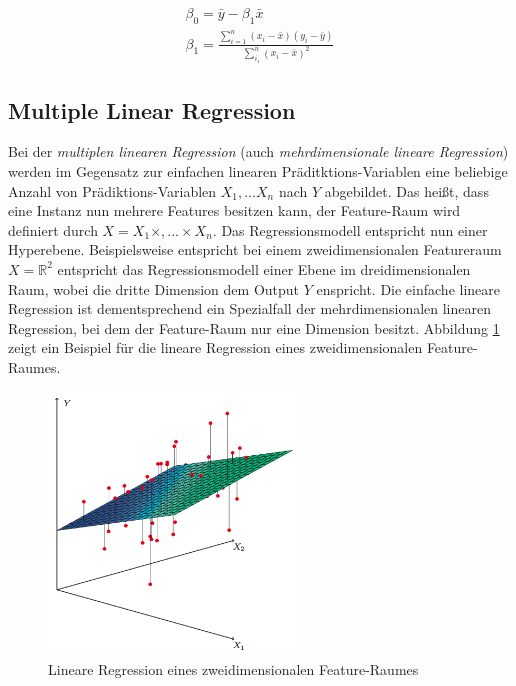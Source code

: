 \begin{equation}
\label{eq:beta0andbeta1}
\begin{gathered}
\beta_0 = \bar{y} - \beta_1 \bar{x} \\
\beta_1 = \frac{\sum_{i = 1}^{n} (x_i - \bar{x}) (y_i - \bar{y}) }{ \sum_{i_1}^{n} (x_i - \bar{x})^2  }
\end{gathered}
\end{equation}

\subsection{Multiple Linear Regression}

Bei der \emph{multiplen linearen Regression} (auch \emph{mehrdimensionale lineare Regression}) werden im Gegensatz zur einfachen linearen Präditktions-Variablen eine beliebige Anzahl von  Prädiktions-Variablen $X_1 , \ldots X_n$ nach $Y$ abgebildet. Das heißt, dass eine Instanz nun mehrere Features besitzen kann, der Feature-Raum wird definiert durch $X = X_1 \times , ... \times X_n$. Das Regressionsmodell entspricht nun einer Hyperebene. Beispielsweise entspricht bei einem zweidimensionalen Featureraum $X = \mathbb{R}^2$ entspricht das Regressionsmodell einer Ebene im dreidimensionalen Raum, wobei die dritte Dimension dem Output $Y$ enspricht. Die einfache lineare Regression ist dementsprechend ein Spezialfall der mehrdimensionalen linearen Regression, bei dem der Feature-Raum nur eine Dimension besitzt. \cite[Multiple Linear Regression]{regression_lecture} \cite[S.71]{statistical_learning} Abbildung \ref{img:multregression} zeigt ein Beispiel für die lineare Regression eines zweidimensionalen Feature-Raumes. 

\begin{figure}[h]
	\centering
	\includegraphics[width=0.6\textwidth]{bilder/multregression.png}
	\caption{Lineare Regression eines zweidimensionalen Feature-Raumes \cite[S. 73]{statistical_learning}}
	\label{img:multregression}
\end{figure}

